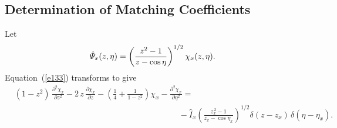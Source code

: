 \documentclass[12pt,prb,aps]{revtex4-1}
\begin{document}
\subsection{Determination of Matching Coefficients}
Let
\begin{equation}
\hat{\mit\Psi}_x (z,\eta) = \left(\frac{z^{2}-1}{z-\cos\eta}\right)^{1/2}\chi_x(z,\eta).
\end{equation}
Equation~(\ref{e133}) transforms to give 
\begin{align}
&(1-z^{2})\,\frac{\partial^2\chi_x}{\partial z^{2}}-2\,z\,\frac{\partial\chi_x}{\partial z}-\left(\frac{1}{4}+\frac{1}{1-z^{2}}\right)\chi_x
-\frac{\partial^2\chi_x}{\partial \eta^{2}}= \nonumber\\[0.5ex]
&\phantom{===============}-\hat{I}_x\left(\frac{z_x^{\,2}-1}{z_x-\cos\eta_x}\right)^{1/2}\delta(z-z_x)\,\delta(\eta-\eta_x).
\end{align}
\end{document}
